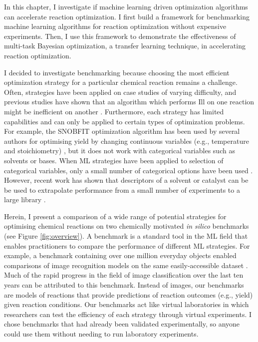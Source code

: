 In this chapter, I investigate if machine learning driven optimization algorithms can accelerate reaction optimization. I first build a framework for benchmarking machine learning algorithms for reaction optimization without expensive experiments. Then, I use this framework to demonstrate the effectiveness of multi-task Bayesian optimization, a transfer learning technique, in accelerating reaction optimization.

I decided to investigate benchmarking because choosing the most efficient optimization strategy for a particular chemical reaction remains a challenge. Often, strategies have been applied on case studies of varying difficulty, and previous studies have shown that an algorithm which performs Ill on one reaction might be inefficient on another \cite{McMullen2010a, Hase2018a}. Furthermore, each strategy has limited capabilities and can only be applied to certain types of optimization problems. For example, the SNOBFIT optimization algorithm has been used by several authors for optimising yield by changing continuous variables (e.g., temperature and stoichiometry) \cite{McMullen2010a, Krishnadasan2007,Holmes2016a}, but it does not work with categorical variables such as solvents or bases. When ML strategies have been applied to selection of categorical variables, only a small number of categorical options have been used \cite{Baumgartner2018}. However, recent work has shown that descriptors of a solvent or catalyst can be be used to extrapolate performance from a small number of experiments to a large library \cite{Amar2019, Reid2019} .

Herein, I present a comparison of a wide range of potential strategies for optimising chemical reactions on two chemically motivated \emph{in silico} benchmarks (see Figure \ref{fig:overview}). A benchmark is a standard tool in the ML field that enables practitioners to compare the performance of different ML strategies. For example, a benchmark containing over one million everyday objects enabled comparisons of image recognition models on the same easily-accessible dataset \cite{Russakovsky2015}. Much of the rapid progress in the field of image classification over the last ten years can be attributed to this benchmark. Instead of images, our benchmarks are models of reactions that provide predictions of reaction outcomes (e.g., yield) given reaction conditions. Our benchmarks act like virtual laboratories in which researchers can test the efficiency of each strategy through virtual experiments. I chose benchmarks that had already been validated experimentally, so anyone could use them without needing to run laboratory experiments. 

